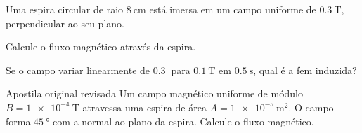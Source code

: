 \blocoaplicacao

\begin{questao}[2]{}
Uma espira circular de raio $\SI{8}{\centi\meter}$ está imersa em um campo
uniforme de $\SI{0.3}{\tesla}$, perpendicular ao seu plano.
\begin{itensq}
\item Calcule o fluxo magnético através da espira.
\item Se o campo variar linearmente de $\SI{0.3}{}$ para $\SI{0.1}{\tesla}$ em
      $\SI{0.5}{\second}$, qual é a fem induzida?
\end{itensq}
\end{questao}

\begin{questao}[2]{Apostila original revisada}
Um campo magnético uniforme de módulo $B=\SI{1e-4}{\tesla}$ atravessa uma espira de
área $A=\SI{1e-5}{\metre\squared}$. O campo forma $\SI{45}{\degree}$ com a normal
ao plano da espira. Calcule o fluxo magnético.
\end{questao}

\blocoaprofundamento

